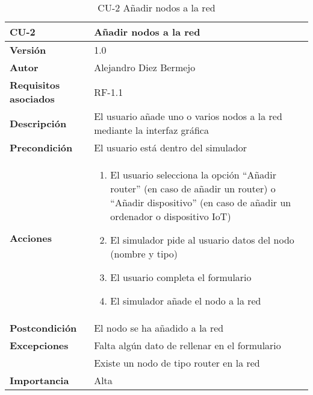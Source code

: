 \begin{table}[p]
	\centering
	\begin{tabularx}{\linewidth}{ p{} p{} }
		\toprule
		\textbf{CU-2}    & \textbf{Añadir nodos a la red}\\
		\toprule
		\textbf{Versión}              & 1.0    \\
		\textbf{Autor}                & Alejandro Diez Bermejo \\
		\textbf{Requisitos asociados} & RF-1.1 \\
		\textbf{Descripción}          & El usuario añade uno o varios nodos a la red mediante la interfaz gráfica \\
		\textbf{Precondición}         & El usuario está dentro del simulador \\
		\textbf{Acciones}             &
		\begin{enumerate}\def\labelenumi{\arabic{enumi}.}\tightlist
			\item El usuario selecciona la opción ``Añadir router'' (en caso de añadir un router) o ``Añadir dispositivo'' (en caso de añadir un ordenador o dispositivo IoT)
			\item El simulador pide al usuario datos del nodo (nombre y tipo)
            \item El usuario completa el formulario
            \item El simulador añade el nodo a la red
		\end{enumerate}\\
		\textbf{Postcondición}        & El nodo se ha añadido a la red \\
		\textbf{Excepciones}          & Falta algún dato de rellenar en el formulario \\
                                      & Existe un nodo de tipo router en la red \\
		\textbf{Importancia}          & Alta \\
		\bottomrule
	\end{tabularx}
	\caption{CU-2 Añadir nodos a la red}
\end{table}

